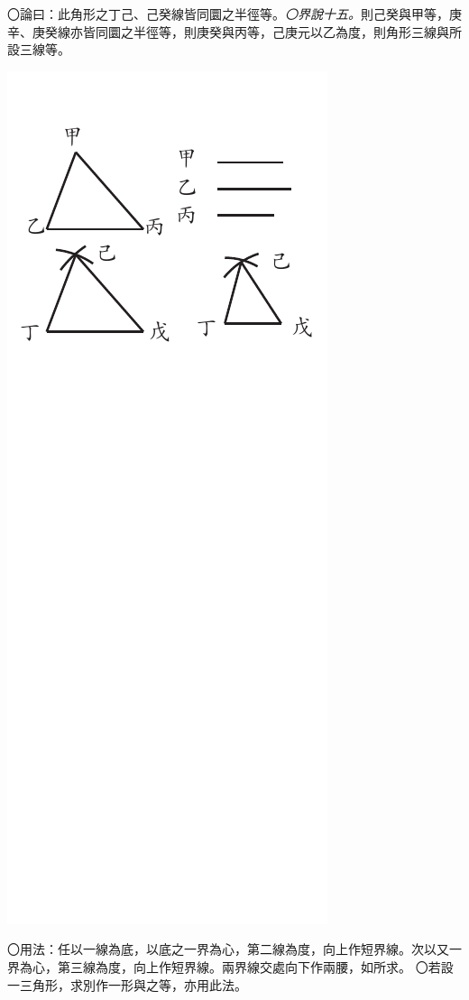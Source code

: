 \documentclass[12pt,b5paper,landscape]{article}
\newcommand{\ccom}[1]{{\footnotesize \emph{〇#1}}}
\newcommand{\bcom}[1]{〇#1}
\begin{document}
\begin{multicols}{2}
\bcom{論曰：此角形之丁己、己癸線皆同圜之半徑等。\ccom{界說十五。}則己癸與甲等，庚辛、庚癸線亦皆同圜之半徑等，則庚癸與丙等，己庚元以乙為度，則角形三線與所設三線等。}
\begin{center}
    \includegraphics[angle=90]{eu68}  
\end{center}
\bcom{用法：任以一線為底，以底之一界為心，第二線為度，向上作短界線。次以又一界為心，第三線為度，向上作短界線。兩界線交處向下作兩腰，如所求。}
\bcom{若設一三角形，求別作一形與之等，亦用此法。}


\end{multicols}
\end{document}
